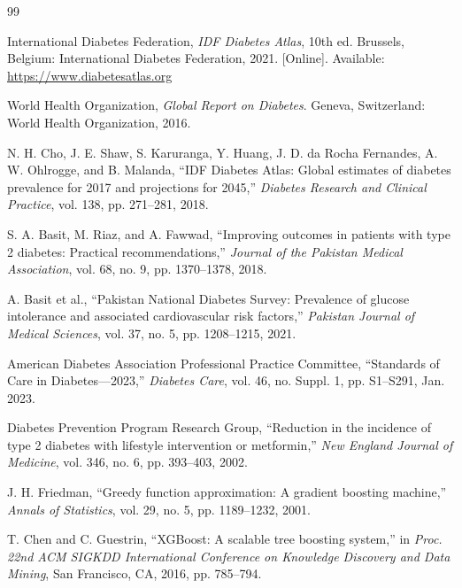 \documentclass[12pt,a4paper]{report}
\begin{document}
\clearpage

\begin{thebibliography}{99}

International Diabetes Federation, \emph{IDF Diabetes Atlas}, 10th ed. Brussels, Belgium: International Diabetes Federation, 2021. [Online]. Available: \url{https://www.diabetesatlas.org}

World Health Organization, \emph{Global Report on Diabetes}. Geneva, Switzerland: World Health Organization, 2016.

N. H. Cho, J. E. Shaw, S. Karuranga, Y. Huang, J. D. da Rocha Fernandes, A. W. Ohlrogge, and B. Malanda, ``IDF Diabetes Atlas: Global estimates of diabetes prevalence for 2017 and projections for 2045,'' \emph{Diabetes Research and Clinical Practice}, vol. 138, pp. 271--281, 2018.

S. A. Basit, M. Riaz, and A. Fawwad, ``Improving outcomes in patients with type 2 diabetes: Practical recommendations,'' \emph{Journal of the Pakistan Medical Association}, vol. 68, no. 9, pp. 1370--1378, 2018.

A. Basit et al., ``Pakistan National Diabetes Survey: Prevalence of glucose intolerance and associated cardiovascular risk factors,'' \emph{Pakistan Journal of Medical Sciences}, vol. 37, no. 5, pp. 1208--1215, 2021.

American Diabetes Association Professional Practice Committee, ``Standards of Care in Diabetes---2023,'' \emph{Diabetes Care}, vol. 46, no. Suppl. 1, pp. S1--S291, Jan. 2023.

Diabetes Prevention Program Research Group, ``Reduction in the incidence of type 2 diabetes with lifestyle intervention or metformin,'' \emph{New England Journal of Medicine}, vol. 346, no. 6, pp. 393--403, 2002.

J. H. Friedman, ``Greedy function approximation: A gradient boosting machine,'' \emph{Annals of Statistics}, vol. 29, no. 5, pp. 1189--1232, 2001.

T. Chen and C. Guestrin, ``XGBoost: A scalable tree boosting system,'' in \emph{Proc. 22nd ACM SIGKDD International Conference on Knowledge Discovery and Data Mining}, San Francisco, CA, 2016, pp. 785--794.


\end{thebibliography}
\end{document}
